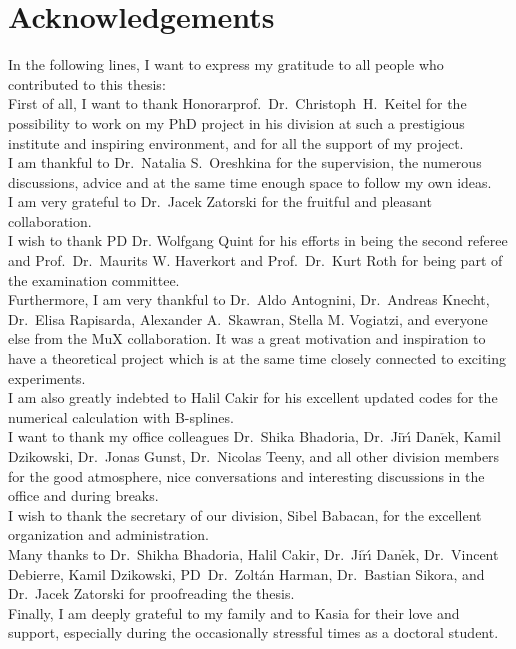 \chapter*{Acknowledgements}

In the following lines, I want to express my gratitude to all people who contributed to this thesis:\\
First of all, I want to thank Honorarprof.~Dr.~Christoph~H.~Keitel for the possibility to work on my PhD project in his division at such a prestigious institute and inspiring environment, and for all the support of my project. \\
I am thankful to Dr.~Natalia S.~Oreshkina for the supervision, the numerous discussions, advice and at the same time enough space to follow my own ideas.\\
I am very grateful to Dr.~Jacek Zatorski for the fruitful and pleasant collaboration.\\
I wish to thank PD Dr. Wolfgang Quint for his efforts in being the second referee and Prof.~Dr.~Maurits W. Haverkort and Prof.~Dr.~Kurt Roth for being part of the examination committee.\\
Furthermore, I am very thankful to Dr.~Aldo Antognini, Dr.~Andreas Knecht, Dr.~Elisa Rapisarda, Alexander A.~Skawran, Stella M. Vogiatzi, and everyone else from the MuX collaboration. It was a great motivation and inspiration to have a theoretical project which is at the same time closely connected to exciting experiments.\\
I am also greatly indebted to Halil Cakir for his excellent updated codes for the numerical calculation with B-splines.\\
I want to thank my  office colleagues Dr.~Shika Bhadoria, Dr.~Ji$\check{\text{r}}${\'\i} Dan$\check{\text{e}}$k, Kamil Dzikowski, Dr.~Jonas Gunst, Dr.~Nicolas Teeny, and all other division members for the good atmosphere, nice conversations and interesting discussions in the office and during breaks.\\
I wish to thank the secretary of our division, Sibel Babacan, for the excellent organization and administration.\\
Many thanks to Dr.~Shikha Bhadoria, Halil Cakir, Dr.~Ji$\check{\text{r}}${\'\i} Dan$\check{\text{e}}$k, Dr.~Vincent Debierre, Kamil Dzikowski, PD~Dr.~Zoltán Harman, Dr.~Bastian Sikora, and Dr.~Jacek Zatorski for proofreading the thesis.\\%
Finally, I am deeply grateful to my family and to Kasia for their love and support, especially during the occasionally stressful times as a doctoral student.
%




